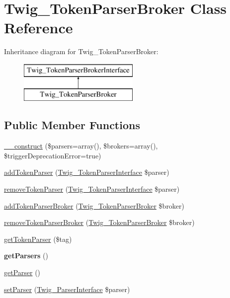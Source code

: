 \hypertarget{classTwig__TokenParserBroker}{}\section{Twig\+\_\+\+Token\+Parser\+Broker Class Reference}
\label{classTwig__TokenParserBroker}
Inheritance diagram for Twig\+\_\+\+Token\+Parser\+Broker\+:\begin{figure}[H]
\begin{center}
\leavevmode
\includegraphics[height=2.000000cm]{classTwig__TokenParserBroker}
\end{center}
\end{figure}
\subsection*{Public Member Functions}
\begin{DoxyCompactItemize}
\item 
\hyperlink{classTwig__TokenParserBroker_a5d8744db6bbb62091ce3170ee6c5d1c5}{\+\_\+\+\_\+construct} (\$parsers=array(), \$brokers=array(), \$trigger\+Deprecation\+Error=true)
\item 
\hyperlink{classTwig__TokenParserBroker_aebf34fb875888d8a4405d857dcde77d0}{add\+Token\+Parser} (\hyperlink{interfaceTwig__TokenParserInterface}{Twig\+\_\+\+Token\+Parser\+Interface} \$parser)
\item 
\hyperlink{classTwig__TokenParserBroker_ae988c6d75b50e26d1fb838d10bb1567e}{remove\+Token\+Parser} (\hyperlink{interfaceTwig__TokenParserInterface}{Twig\+\_\+\+Token\+Parser\+Interface} \$parser)
\item 
\hyperlink{classTwig__TokenParserBroker_a82eee53338b4b6a8f679ad147f27f353}{add\+Token\+Parser\+Broker} (\hyperlink{classTwig__TokenParserBroker}{Twig\+\_\+\+Token\+Parser\+Broker} \$broker)
\item 
\hyperlink{classTwig__TokenParserBroker_a21495921008c729a60f44591911e5e59}{remove\+Token\+Parser\+Broker} (\hyperlink{classTwig__TokenParserBroker}{Twig\+\_\+\+Token\+Parser\+Broker} \$broker)
\item 
\hyperlink{classTwig__TokenParserBroker_a164503b0655af339379d1bb7417c6fc0}{get\+Token\+Parser} (\$tag)
\item 
{\bfseries get\+Parsers} ()\hypertarget{classTwig__TokenParserBroker_a81afbbc8d8381996583a40037e52694a}{}\label{classTwig__TokenParserBroker_a81afbbc8d8381996583a40037e52694a}

\item 
\hyperlink{classTwig__TokenParserBroker_a128d92c8671599f3efb6ade94cfc287b}{get\+Parser} ()
\item 
\hyperlink{classTwig__TokenParserBroker_ae163a5c2248575e7348d038ccdc3eb62}{set\+Parser} (\hyperlink{interfaceTwig__ParserInterface}{Twig\+\_\+\+Parser\+Interface} \$parser)
\end{DoxyCompactItemize}
